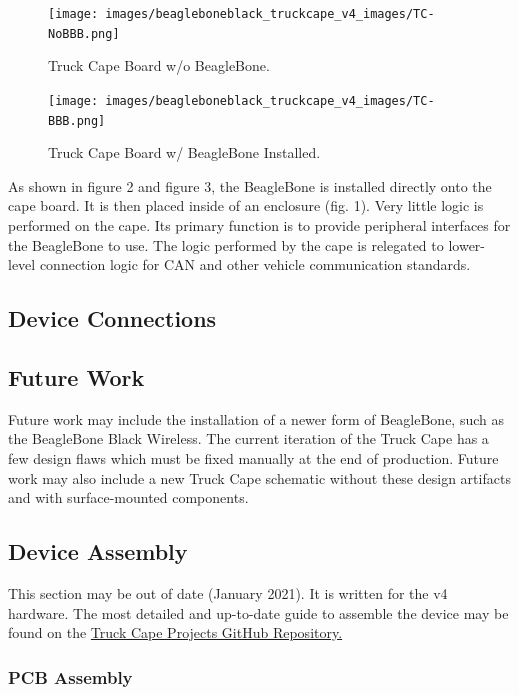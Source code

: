         \begin{figure}
            \centering
            \begin{minipage}[b]{0.4\textwidth}
                \texttt{[image: images/beagleboneblack\_truckcape\_v4\_images/TC-NoBBB.png]}
                \caption{Truck Cape Board w/o BeagleBone.}
            \end{minipage}
            \hfill
            \begin{minipage}[b]{0.4\textwidth}
                \texttt{[image: images/beagleboneblack\_truckcape\_v4\_images/TC-BBB.png]}
                \caption{Truck Cape Board w/ BeagleBone Installed.}
            \end{minipage}
        \end{figure}

        As shown in figure 2 and figure 3, the BeagleBone is installed directly onto the cape board. It is then placed inside of an enclosure (fig. 1). Very little logic is performed on the cape. Its primary function is to provide peripheral interfaces for the BeagleBone to use. The logic performed by the cape is relegated to lower-level connection logic for CAN and other vehicle communication standards. 

    \subsection{Device Connections}

    \subsection{Future Work}
        Future work may include the installation of a newer form of BeagleBone, such as the BeagleBone Black Wireless.  The current iteration of the Truck Cape has a few design flaws which must be fixed manually at the end of production. Future work may also include a new Truck Cape schematic without these design artifacts and with surface-mounted components.

    \subsection{Device Assembly}
    This section may be out of date (January 2021). It is written for the v4 hardware. The most detailed and up-to-date guide to assemble the device may be found on the \href{https://github.com/SystemsCyber/TruckCapeProjects}{Truck Cape Projects GitHub Repository.}
        \subsubsection{PCB Assembly}
